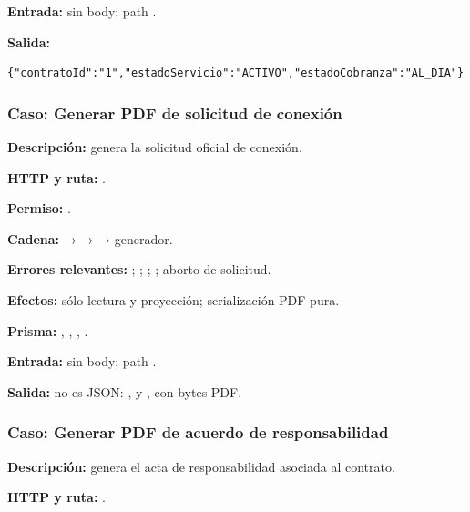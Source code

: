 \textbf{Entrada:} sin body; path \texttt{}.  

\textbf{Salida:}


\begin{lstlisting}
{"contratoId":"1","estadoServicio":"ACTIVO","estadoCobranza":"AL_DIA"}
\end{lstlisting}


\subsubsection{Caso: Generar PDF de solicitud de conexión}


\textbf{Descripción:} genera la solicitud oficial de conexión.  

\textbf{HTTP y ruta:} \texttt{}.  

\textbf{Permiso:} \texttt{}.  

\textbf{Cadena:} \texttt{} → \texttt{} → \texttt{} → generador.  

\textbf{Errores relevantes:} \texttt{}; \texttt{}; \texttt{}; \texttt{}; aborto de solicitud.  

\textbf{Efectos:} sólo lectura y proyección; serialización PDF pura.  

\textbf{Prisma:} \texttt{}, \texttt{}, \texttt{}, \texttt{}.  

\textbf{Entrada:} sin body; path \texttt{}.  

\textbf{Salida:} no es JSON: \texttt{}, \texttt{} y \texttt{}, con bytes PDF.


\subsubsection{Caso: Generar PDF de acuerdo de responsabilidad}


\textbf{Descripción:} genera el acta de responsabilidad asociada al contrato.  

\textbf{HTTP y ruta:} \texttt{}.  

